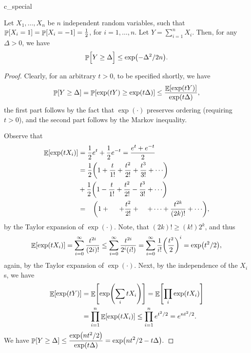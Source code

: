 \begin{fragment}{c_special}
    \begin{theorem}
        Let $X_1, \ldots, X_n$ be $n$ independent random variables,\newline
        such that $\Prob{X_i =1} =\Prob{X_i=-1} = \frac{1}{2}$, for
        $i=1,\ldots, n$. Let $Y = \sum_{i=1}^n X_i$. Then, for any
        $\Delta >0$, we have
        \begin{align*}
            \Prob{\Bigl. Y \geq \Delta} \leq \exp \pth{-\Delta^2/2n}.
        \end{align*}
    \end{theorem}%
\end{fragment}
%
\begin{proof}
    Clearly, for an arbitrary $t > 0$, to be specified shortly, we have
    \begin{align*}
        \Prob{Y \geq \Delta} = \Prob{\exp \pth{ t Y } \geq \exp
           \pth{t\Delta}} \leq \frac{\Ex{\exp \pth{t Y}}}{\exp
           \pth{t\Delta}},
    \end{align*}
    the first part follows by the fact that $\exp(\cdot)$ preserves ordering
    (requiring $t > 0$), and the second part follows by the Markov
    inequality.

    Observe that
    \begin{align*}
        \Ex{ \exp\pth{t X_i} }%
        &=%
        \frac{1}{2} e^{t} + \frac{1}{2}e^{-t} =
        \frac{e^t + e^{-t}}{2}\\
        &=%
        \frac{1}{2} \pth{1 + \frac{t}{1!} + \frac{t^2}{2!} +
           \frac{t^3}{3!} + \cdots}
        \\
        &+%
        \frac{1}{2}\pth{1 -\frac{t}{1!} + \frac{t^2}{2!} -
           \frac{t^3}{3!}
           + \cdots}\\
        &=%
        \;\; \;\pth{1 +\;\;\;\;\; + \frac{t^2}{2!} + \;\;\;\; +\cdots
           + \frac{t^{2k}}{(2k)!}  + \cdots},
    \end{align*}
    by the Taylor expansion of $\exp(\cdot)$. Note, that $(2k)!\geq
    (k!) 2^k$, and thus
    \begin{align*}
        \Ex{ \exp \pth{ t X_i } } = \sum_{i=0}^{\infty}
        \frac{t^{2i}}{(2i)!} \leq \sum_{i=0}^{\infty}
        \frac{t^{2i}}{2^i(i!)} = \sum_{i=0}^{\infty} \frac{1}{i!}\pth{
           \frac{t^2}{2}}^i = \exp \pth{t^2/2},
    \end{align*}
    again, by the Taylor expansion of $\exp(\cdot)$. Next, by the
    independence of the $X_i$s, we have
    \begin{align*}
        \Ex{\exp \pth{t Y}}%
        &=%
        \Ex{\exp \pth{\sum_i t X_i}}%
        =%
        \Ex{\prod_i \exp\pth{t X_i}} \\
        &=%
        \prod_{i=1}^{n} \Ex{\exp\pth{t X_i}}
        \leq%
        \prod_{i=1}^{n} e^{t^2/2}%
        =%
        e^{n t^2/2}.
    \end{align*}
    We have
    \begin{math}
        \ds \Prob{Y \geq \Delta} \leq \frac{\exp\pth{n t^2/2}}{\exp
           \pth{t\Delta}} = \exp \pth{n t^2/2 - t\Delta}.
    \end{math}


\end{proof}
